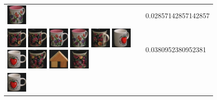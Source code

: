 \begin{figure}[tbp]
\begin{center}
\begin{tabular}{m{11cm} | m{3cm} |}
\includegraphics[width=1cm]{coil/beeld-9.eps}
& {\scriptsize 0.02857142857142857}
\\
\includegraphics[width=1cm]{coil/beeld-60.eps}
\includegraphics[width=1cm]{coil/beeld-60.eps}
\includegraphics[width=1cm]{coil/beeld-6.eps}
\includegraphics[width=1cm]{coil/beeld-9.eps}
\includegraphics[width=1cm]{coil/beeld-64.eps}
\includegraphics[width=1cm]{coil/beeld-39.eps}
\includegraphics[width=1cm]{coil/beeld-36.eps}
\includegraphics[width=1cm]{coil/beeld-63.eps}
\includegraphics[width=1cm]{coil/beeld-43.eps}
\includegraphics[width=1cm]{coil/beeld-62.eps}
& {\scriptsize 0.0380952380952381}
\\
\includegraphics[width=1cm]{coil/beeld-36.eps}

\end{tabular}
\end{center}
\end{figure}

